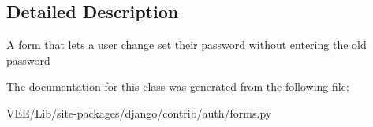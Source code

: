 \subsection{Detailed Description}
\begin{DoxyVerb}A form that lets a user change set their password without entering the old
password
\end{DoxyVerb}
 

The documentation for this class was generated from the following file\+:\begin{DoxyCompactItemize}
\item 
V\+E\+E/\+Lib/site-\/packages/django/contrib/auth/forms.\+py\end{DoxyCompactItemize}
